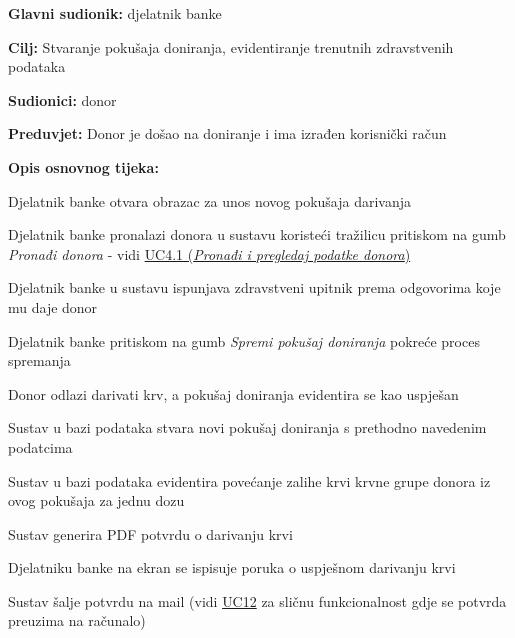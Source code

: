 					
					\noindent {}
					\begin{packed_item} \label{UC6}
	
						\item \textbf{Glavni sudionik: }djelatnik banke
						\item  \textbf{Cilj:} Stvaranje pokušaja doniranja, evidentiranje trenutnih zdravstvenih podataka
						\item  \textbf{Sudionici:} donor
						\item  \textbf{Preduvjet:} Donor je došao na doniranje i ima izrađen korisnički račun 
						\item  \textbf{Opis osnovnog tijeka:}
						
						\item[] \begin{packed_enum}
	
							\item Djelatnik banke otvara obrazac za unos novog pokušaja darivanja
							\item Djelatnik banke pronalazi donora u sustavu koristeći tražilicu pritiskom na gumb \textit{Pronađi donora} - vidi \hyperref[UC4.1]{UC4.1 (\textit{Pronađi i pregledaj podatke donora})}
							\item Djelatnik banke u sustavu ispunjava zdravstveni upitnik prema odgovorima koje mu daje donor
	                        \item Djelatnik banke pritiskom na gumb \textit{Spremi pokušaj doniranja} pokreće proces spremanja
	                        \item Donor odlazi darivati krv, a pokušaj doniranja evidentira se kao uspješan
	                        \item Sustav u bazi podataka stvara novi pokušaj doniranja s prethodno navedenim podatcima
	                        \item Sustav u bazi podataka evidentira povećanje zalihe krvi krvne grupe donora iz ovog pokušaja za jednu dozu
	                        \item Sustav generira PDF potvrdu o darivanju krvi
	                        \item Djelatniku banke na ekran se ispisuje poruka o uspješnom darivanju krvi
	                        \item Sustav šalje potvrdu na mail (vidi \hyperref[UC12]{UC12} za sličnu funkcionalnost gdje se potvrda preuzima na računalo)

						\end{packed_enum}
						

\end{packed_item}
